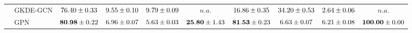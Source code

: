 \begin{table*}[!h]
{\begin{tabular}{ll|cccc|cccc}
        & GKDE-GCN & ${76.40\tiny \pm 0.33}$ & ${9.55\tiny \pm 0.10}$ & ${9.79\tiny \pm 0.09}$ & $n.a.$ & ${16.86\tiny \pm 0.35}$ & ${{34.20}\tiny \pm 0.53}$ & ${2.64\tiny \pm 0.06}$ & $n.a.$\\
        & GPN & ${\mathbf{80.98}\tiny \pm 0.22}$ & ${6.96\tiny \pm 0.07}$ & ${5.63\tiny \pm 0.03}$ & ${\mathbf{25.80}\tiny \pm 1.43}$ & ${\mathbf{81.53}\tiny \pm 0.23}$ & ${6.63\tiny \pm 0.07}$ & ${6.21\tiny \pm 0.08}$ & ${\mathbf{100.00}\tiny \pm 0.00}$\\
                        
        \midrule
        

\end{tabular}}
\end{table*}
